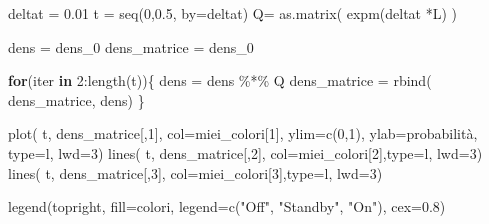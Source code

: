 \documentclass[
  italian,
  letterpaper,
]{book}
\newenvironment{Shaded}{\begin{snugshade}}{\end{snugshade}}
\newcommand{\AttributeTok}[1]{\textcolor[rgb]{0.40,0.45,0.13}{#1}}
\newcommand{\ControlFlowTok}[1]{\textcolor[rgb]{0.00,0.23,0.31}{\textbf{#1}}}
\newcommand{\DecValTok}[1]{\textcolor[rgb]{0.68,0.00,0.00}{#1}}
\newcommand{\FloatTok}[1]{\textcolor[rgb]{0.68,0.00,0.00}{#1}}
\newcommand{\FunctionTok}[1]{\textcolor[rgb]{0.28,0.35,0.67}{#1}}
\newcommand{\NormalTok}[1]{\textcolor[rgb]{0.00,0.23,0.31}{#1}}
\newcommand{\OtherTok}[1]{\textcolor[rgb]{0.00,0.23,0.31}{#1}}
\newcommand{\SpecialCharTok}[1]{\textcolor[rgb]{0.37,0.37,0.37}{#1}}
\newcommand{\StringTok}[1]{\textcolor[rgb]{0.13,0.47,0.30}{#1}}
\theoremstyle{definition}
\theoremstyle{remark}
\begin{document}
\begin{Shaded}
\begin{Highlighting}[]
\NormalTok{deltat }\OtherTok{=} \FloatTok{0.01}
\NormalTok{t }\OtherTok{=} \FunctionTok{seq}\NormalTok{(}\DecValTok{0}\NormalTok{,}\FloatTok{0.5}\NormalTok{, }\AttributeTok{by=}\NormalTok{deltat)}
\NormalTok{Q}\OtherTok{=} \FunctionTok{as.matrix}\NormalTok{( }\FunctionTok{expm}\NormalTok{(deltat }\SpecialCharTok{*}\NormalTok{L) )}

\NormalTok{dens }\OtherTok{=}\NormalTok{ dens\_0}
\NormalTok{dens\_matrice }\OtherTok{=}\NormalTok{ dens\_0}

\ControlFlowTok{for}\NormalTok{(iter }\ControlFlowTok{in} \DecValTok{2}\SpecialCharTok{:}\FunctionTok{length}\NormalTok{(t))\{}
\NormalTok{  dens }\OtherTok{=}\NormalTok{ dens }\SpecialCharTok{\%*\%}\NormalTok{ Q}
\NormalTok{  dens\_matrice }\OtherTok{=} \FunctionTok{rbind}\NormalTok{( dens\_matrice, dens)}
\NormalTok{\}}

\FunctionTok{plot}\NormalTok{( t, dens\_matrice[,}\DecValTok{1}\NormalTok{], }\AttributeTok{col=}\NormalTok{miei\_colori[}\DecValTok{1}\NormalTok{], }\AttributeTok{ylim=}\FunctionTok{c}\NormalTok{(}\DecValTok{0}\NormalTok{,}\DecValTok{1}\NormalTok{), }\AttributeTok{ylab=}\StringTok{\textquotesingle{}probabilità\textquotesingle{}}\NormalTok{, }\AttributeTok{type=}\StringTok{\textquotesingle{}l\textquotesingle{}}\NormalTok{, }\AttributeTok{lwd=}\DecValTok{3}\NormalTok{)}
\FunctionTok{lines}\NormalTok{( t, dens\_matrice[,}\DecValTok{2}\NormalTok{], }\AttributeTok{col=}\NormalTok{miei\_colori[}\DecValTok{2}\NormalTok{],}\AttributeTok{type=}\StringTok{\textquotesingle{}l\textquotesingle{}}\NormalTok{, }\AttributeTok{lwd=}\DecValTok{3}\NormalTok{)}
\FunctionTok{lines}\NormalTok{( t, dens\_matrice[,}\DecValTok{3}\NormalTok{], }\AttributeTok{col=}\NormalTok{miei\_colori[}\DecValTok{3}\NormalTok{],}\AttributeTok{type=}\StringTok{\textquotesingle{}l\textquotesingle{}}\NormalTok{, }\AttributeTok{lwd=}\DecValTok{3}\NormalTok{)}



\FunctionTok{legend}\NormalTok{(}\StringTok{\textquotesingle{}topright\textquotesingle{}}\NormalTok{, }\AttributeTok{fill=}\NormalTok{colori, }\AttributeTok{legend=}\FunctionTok{c}\NormalTok{(}\StringTok{"Off"}\NormalTok{, }\StringTok{"Standby"}\NormalTok{, }\StringTok{"On"}\NormalTok{), }\AttributeTok{cex=}\FloatTok{0.8}\NormalTok{)}
\end{Highlighting}
\end{Shaded}
\end{document}
